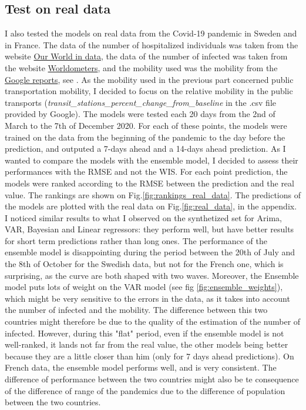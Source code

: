 \subsection{Test on real data}


I also tested the models on real data from the Covid-19 pandemic in Sweden and in France. 
The data of the number of hospitalized individuals was taken from the website \href{https://ourworldindata.org/covid-hospitalizations}{Our World in data}, the data of the number of infected was taken from the website \href{ https://www.worldometers.info/coronavirus/country/sweden/#coronavirus-cases-linear}{Worldometers}, and the mobility used was the mobility from the \href{https://www.google.com/covid19/mobility/}{ Google reports}, see \cite{google_covid19_mobility}. 
As the mobility used in the previous part concerned public transportation mobility, I decided to focus on the relative mobility in the public transports (\textit{transit\_stations\_percent\_change\_from\_baseline} in the .csv file provided by Google).
The models were tested each 20 days from the 2nd of March to the 7th of December 2020. 
For each of these points, the models were trained on the data from the beginning of the pandemic to the day before the prediction, and outputed a 7-days ahead and a 14-days ahead prediction. 
As I wanted to compare the models with the ensemble model, I decided to assess their performances with the RMSE and not the WIS. 
For each point prediction, the models were ranked according to the RMSE between the prediction and the real value. 
The rankings are shown on Fig.\ref{fig:rankings_real_data}. 
The predictions of the models are plotted with the real data on Fig.\ref{fig:real_data}, in the appendix. 
I noticed similar results to what I observed on the synthetized set for Arima, VAR, Bayesian and Linear regressors: they perform well, but have better results for short term predictions rather than long ones. 
The performance of the ensemble model is disappointing during the period between the 20th of July and the 8th of October for the Swedish data, but not for the French one, which is surprising, as the curve are both shaped with two waves. 
Moreover, the Ensemble model puts lots of weight on the VAR model (see fig \ref{fig:ensemble_weights}), which might be very sensitive to the errors in the data, as it takes into account the number of infected and the mobility.
The difference between this two countries might therefore be due to the quality of the estimation of the number of infected. 
However, during this "flat" period,  even if the ensemble model is not well-ranked, it lands not far from the real value, the other models being better because they are a little closer than him (only for 7 days ahead predictions). 
On French data, the ensemble model performs well, and is very consistent. 
The difference of performance between the two countries might also be te consequence of the difference of range of the pandemics due to the difference of population between the two countries. 

